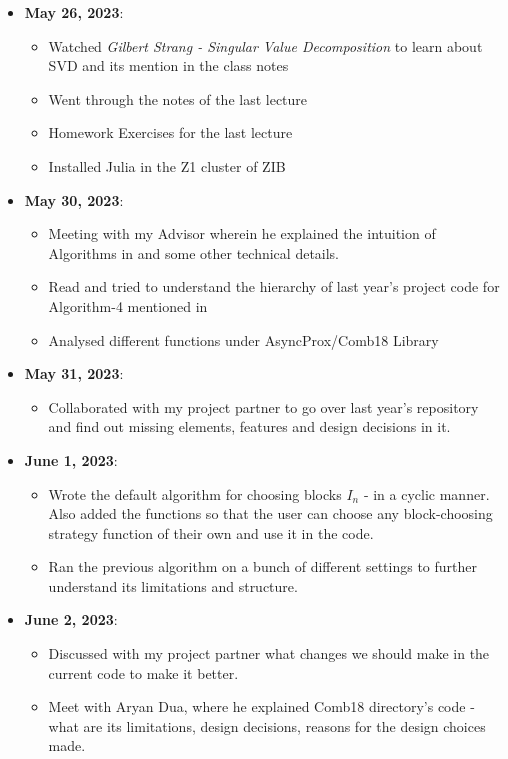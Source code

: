 \documentclass[a4paper,11pt,fleqn]{article}
\theoremstyle{plain}{\theorembodyfont{\rmfamily}%
\newtheorem{conjecture}[theorem]{Conjecture}}
\theoremstyle{plain}{\theorembodyfont{\rmfamily}%
\newtheorem{example}[theorem]{Example}}
\theoremstyle{plain}{\theorembodyfont{\rmfamily}%
\newtheorem{remark}[theorem]{Remark}}
\theoremstyle{plain}{\theorembodyfont{\rmfamily}%
\newtheorem{algorithm}[theorem]{Algorithm}}
\theoremstyle{plain}{\theorembodyfont{\rmfamily}%
\newtheorem{condition}[theorem]{Condition}}
\theoremstyle{plain}{\theorembodyfont{\rmfamily}%
\newtheorem{definition}[theorem]{Definition}}
\theoremstyle{plain}{\theorembodyfont{\rmfamily}
\newtheorem{fact}[theorem]{Fact}}
\theoremstyle{plain}{\theorembodyfont{\rmfamily}
\newtheorem{problem}[theorem]{Problem}}
\theoremstyle{plain}{\theorembodyfont{\rmfamily}
\newtheorem{notation}[theorem]{Notation}}
\theoremstyle{plain}{\theorembodyfont{\rmfamily}
\newtheorem{project}[theorem]{Project}}
\begin{document}
\begin{itemize}
\item {\bf May 26, 2023}:
\begin{itemize} 
\item Watched \textit{Gilbert Strang - Singular Value Decomposition} to learn about SVD and its mention in the class notes
\item Went through the notes of the last lecture
\item Homework Exercises for the last lecture
\item Installed Julia in the Z1 cluster of ZIB
\end{itemize}

\item {\bf May 30, 2023}:
\begin{itemize} 
\item Meeting with my Advisor wherein he explained the intuition of Algorithms in \cite{PCombetteEckstein} and some other technical details.
\item Read and tried to understand the hierarchy of last year's project code for Algorithm-4 mentioned in \cite{PCombetteEckstein}
\item Analysed different functions under AsyncProx/Comb18 Library
\end{itemize}

\item {\bf May 31, 2023}:
\begin{itemize} 
\item Collaborated with my project partner to go over last year's repository and find out missing elements, features and design decisions in it.
\end{itemize}

\item {\bf June 1, 2023}:
\begin{itemize} 
\item Wrote the default algorithm for choosing blocks $I_n$ - in a cyclic manner. Also added the functions so that the user can choose any block-choosing strategy function of their own and use it in the code.
\item Ran the previous algorithm on a bunch of different settings to further understand its limitations and structure.
\end{itemize}

\item {\bf June 2, 2023}:
\begin{itemize} 
\item Discussed with my project partner what changes we should make in the current code to make it better.
\item Meet with Aryan Dua, where he explained Comb18 directory's code - what are its limitations, design decisions, reasons for the design choices made.
\end{itemize}


\end{itemize}
\end{document}

